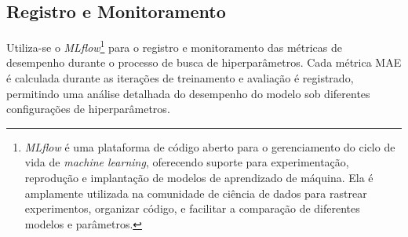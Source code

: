 \subsection{Registro e Monitoramento}
Utiliza-se o \textit{MLflow}\footnote{\textit{MLflow} é uma plataforma de código aberto para o gerenciamento do ciclo de vida de \textit{machine learning}, oferecendo suporte para experimentação, reprodução e implantação de modelos de aprendizado de máquina. Ela é amplamente utilizada na comunidade de ciência de dados para rastrear experimentos, organizar código, e facilitar a comparação de diferentes modelos e parâmetros.} para o registro e monitoramento das métricas de desempenho durante o processo de busca de hiperparâmetros. Cada métrica MAE é calculada durante as iterações de treinamento e avaliação é registrado, permitindo uma análise detalhada do desempenho do modelo sob diferentes configurações de hiperparâmetros.